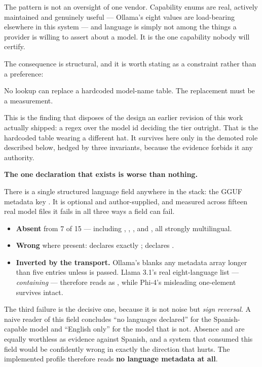 The pattern is not an oversight of one vendor. Capability enums are real,
actively maintained and genuinely useful --- Ollama's eight values are
load-bearing elsewhere in this system --- and language is simply not among the
things a provider is willing to assert about a model. It is the one capability
nobody will certify.

The consequence is structural, and it is worth stating as a constraint rather
than a preference:

\begin{keyinsight}
No lookup can replace a hardcoded model-name table. The replacement must be a
measurement.
\end{keyinsight}

This is the finding that disposes of the design an earlier revision of this work
actually shipped: a regex over the model id deciding the tier outright. That is
the hardcoded table wearing a different hat. It survives here only in the
demoted role described below, hedged by three invariants, because the evidence
forbids it any authority.

\textbf{The one declaration that exists is worse than nothing.}

There is a single structured language field anywhere in the stack: the GGUF
metadata key . It is optional and author-supplied, and
measured across fifteen real model files it fails in all three ways a field can
fail.

\begin{itemize}
  \item \textbf{Absent} from 7 of 15 --- including ,
        , ,  and
        , all strongly multilingual.
  \item \textbf{Wrong} where present:  declares
        exactly \code{["en"]};  declares \code{["en"]}.
  \item \textbf{Inverted by the transport.} Ollama's 
        blanks any metadata array longer than five entries unless
         is passed. Llama 3.1's real eight-language list
        --- \emph{containing}  --- therefore reads as \code{[]}, while
        Phi-4's misleading one-element \code{["en"]} survives intact.
\end{itemize}

The third failure is the decisive one, because it is not noise but \emph{sign
reversal}. A naive reader of this field concludes ``no languages declared'' for
the Spanish-capable model and ``English only'' for the model that is not.
Absence and \code{["en"]} are equally worthless as evidence against Spanish, and
a system that consumed this field would be confidently wrong in exactly the
direction that hurts. The implemented profile therefore reads \textbf{no
language metadata at all}.

